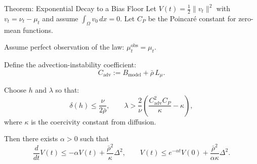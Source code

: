 \documentclass[aspectratio=169]{beamer}
\begin{document}
\begin{frame}{Theorem: Exponential Decay to a Bias Floor}
Let $V(t)=\frac12\|v_t\|^2$ with $v_t=\nu_t-\mu_t$ and assume $\int_\Omega v_0\,dx=0$.
Let $C_P$ be the Poincar\'e constant for zero-mean functions.

\medskip
Assume perfect observation of the law: $\mu_t^{\text{obs}}=\mu_t$.

\medskip
Define the advection-instability coefficient:
\[
C_{\text{adv}} := B_{\text{model}} + \bar\rho\,L_\mu.
\]

Choose $h$ and $\lambda$ so that:
\[
\delta(h)\le \frac{\nu}{2\bar\rho},
\qquad
\lambda > \frac{2}{\nu}\left(\frac{C_{\text{adv}}^2 C_P}{\kappa}-\kappa\right),
\]
where $\kappa$ is the coercivity constant from diffusion.

\medskip
Then there exists $\alpha>0$ such that
\[
\frac{d}{dt}V(t)\le -\alpha V(t) + \frac{\bar\rho^2}{\kappa}\Delta^2,
\qquad
V(t)\le e^{-\alpha t}V(0)+\frac{\bar\rho^2}{\alpha\kappa}\Delta^2.
\]
\end{frame}






\end{document}
